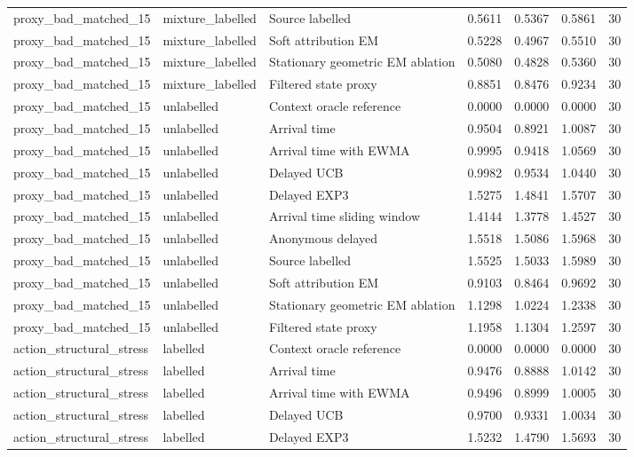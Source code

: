\begin{tabular}{llllllr}
proxy\_bad\_matched\_15 & mixture\_labelled & Source labelled & 0.5611 & 0.5367 & 0.5861 & 30 \\
proxy\_bad\_matched\_15 & mixture\_labelled & Soft attribution EM & 0.5228 & 0.4967 & 0.5510 & 30 \\
proxy\_bad\_matched\_15 & mixture\_labelled & Stationary geometric EM ablation & 0.5080 & 0.4828 & 0.5360 & 30 \\
proxy\_bad\_matched\_15 & mixture\_labelled & Filtered state proxy & 0.8851 & 0.8476 & 0.9234 & 30 \\
proxy\_bad\_matched\_15 & unlabelled & Context oracle reference & 0.0000 & 0.0000 & 0.0000 & 30 \\
proxy\_bad\_matched\_15 & unlabelled & Arrival time & 0.9504 & 0.8921 & 1.0087 & 30 \\
proxy\_bad\_matched\_15 & unlabelled & Arrival time with EWMA & 0.9995 & 0.9418 & 1.0569 & 30 \\
proxy\_bad\_matched\_15 & unlabelled & Delayed UCB & 0.9982 & 0.9534 & 1.0440 & 30 \\
proxy\_bad\_matched\_15 & unlabelled & Delayed EXP3 & 1.5275 & 1.4841 & 1.5707 & 30 \\
proxy\_bad\_matched\_15 & unlabelled & Arrival time sliding window & 1.4144 & 1.3778 & 1.4527 & 30 \\
proxy\_bad\_matched\_15 & unlabelled & Anonymous delayed & 1.5518 & 1.5086 & 1.5968 & 30 \\
proxy\_bad\_matched\_15 & unlabelled & Source labelled & 1.5525 & 1.5033 & 1.5989 & 30 \\
proxy\_bad\_matched\_15 & unlabelled & Soft attribution EM & 0.9103 & 0.8464 & 0.9692 & 30 \\
proxy\_bad\_matched\_15 & unlabelled & Stationary geometric EM ablation & 1.1298 & 1.0224 & 1.2338 & 30 \\
proxy\_bad\_matched\_15 & unlabelled & Filtered state proxy & 1.1958 & 1.1304 & 1.2597 & 30 \\
action\_structural\_stress & labelled & Context oracle reference & 0.0000 & 0.0000 & 0.0000 & 30 \\
action\_structural\_stress & labelled & Arrival time & 0.9476 & 0.8888 & 1.0142 & 30 \\
action\_structural\_stress & labelled & Arrival time with EWMA & 0.9496 & 0.8999 & 1.0005 & 30 \\
action\_structural\_stress & labelled & Delayed UCB & 0.9700 & 0.9331 & 1.0034 & 30 \\
action\_structural\_stress & labelled & Delayed EXP3 & 1.5232 & 1.4790 & 1.5693 & 30 \\

\end{tabular}
